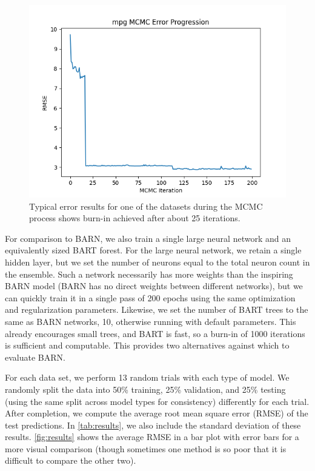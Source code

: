 \documentclass[12pt]{article}
\begin{document}
\begin{figure}[ht]
\centering
    \includegraphics[scale=0.66]{figs/mpg_phi.png}
    \caption{Typical error results for one of the datasets during the MCMC process shows burn-in achieved after about 25 iterations.}
    \label{fig:phi}
\end{figure}

For comparison to BARN, we also train a single large neural network and an equivalently sized BART forest.  For the large neural network, we retain a single hidden layer, but we set the number of neurons equal to the total neuron count in the ensemble.  Such a network necessarily has more weights than the inspiring BARN model (BARN has no direct weights between different networks), but we can quickly train it in a single pass of 200 epochs using the same optimization and regularization parameters.  Likewise, we set the number of BART trees to the same as BARN networks, 10, otherwise running with default parameters.  This already encourages small trees, and BART is fast, so a burn-in of 1000 iterations is sufficient and computable.  This provides two alternatives against which to evaluate BARN.

For each data set, we perform 13 random trials with each type of model.  We randomly split the data into 50\% training, 25\% validation, and 25\% testing (using the same split across model types for consistency) differently for each trial.  After completion, we compute the average root mean square error (RMSE) of the test predictions.  In \autoref{tab:results}, we also include the standard deviation of these results.  \autoref{fig:results} shows the average RMSE in a bar plot with error bars for a more visual comparison (though sometimes one method is so poor that it is difficult to compare the other two).
\end{document}
